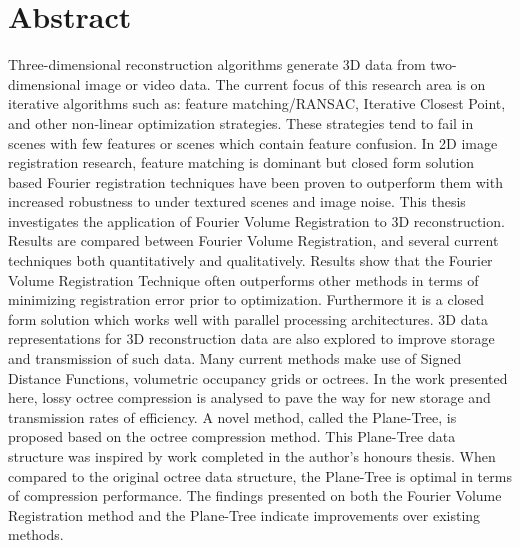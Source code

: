 \makeatletter
\chapter{Abstract}

Three-dimensional reconstruction algorithms generate 3D data from two-dimensional image or video data. The current focus of this research area is on iterative algorithms such as: feature matching/RANSAC, Iterative Closest Point, and other non-linear optimization strategies. These strategies tend to fail in scenes with few features or scenes which contain feature confusion. In 2D image registration research, feature matching is dominant but closed form solution based Fourier registration techniques have been proven to outperform them with increased robustness to under textured scenes and image noise. This thesis investigates the application of Fourier Volume Registration to 3D reconstruction. Results are compared between Fourier Volume Registration, and several current techniques both quantitatively and qualitatively. Results show that the Fourier Volume Registration Technique often outperforms other methods in terms of minimizing registration error prior to optimization. Furthermore it is a closed form solution which works well with parallel processing architectures. 3D data representations for 3D reconstruction data are also explored to improve storage and transmission of such data. Many current methods make use of Signed Distance Functions, volumetric occupancy grids or octrees. In the work presented here, lossy octree compression is analysed to pave the way for new storage and transmission rates of efficiency. A novel method, called the Plane-Tree, is proposed based on the octree compression method. This Plane-Tree data structure was inspired by work completed in the author's honours thesis. When compared to the original octree data structure, the Plane-Tree is optimal in terms of compression performance. The findings presented on both the Fourier Volume Registration method and the Plane-Tree indicate improvements over existing methods.


